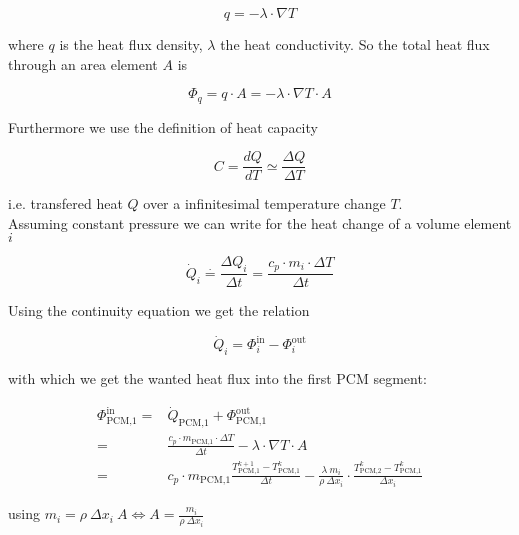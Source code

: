 \documentclass{scrartcl}[12pt, halfparskip]
\begin{document}
\begin{equation}
	q = - \lambda \cdot \nabla T
\end{equation}
\label{eq:def_fouriers_law}

where $q$ is the heat flux density, $\lambda$ the heat conductivity. So the total heat flux through an area element $A$ is

\begin{equation*}
	\Phi_q = q \cdot A =  - \lambda \cdot \nabla T \cdot A
\end{equation*}

Furthermore we use the definition of heat capacity

\begin{equation}
	C = \frac{dQ}{dT} \simeq \frac{\Delta Q}{\Delta T}
\end{equation}
\label{eq:def_heat_capacity}

i.e. transfered heat $Q$ over a infinitesimal temperature change $T$. \\

Assuming constant pressure we can write for the heat change of a volume element $i$

\begin{equation*}
	\dot{Q}_i \stackrel{\cdot}{=} \frac{\Delta Q_i}{\Delta t} = \frac{c_p \cdot m_i \cdot \Delta T}{\Delta t}
\end{equation*}

Using the continuity equation we get the relation

\begin{equation*}
	\dot{Q}_i = \Phi_i^{\text{in}} - \Phi_i^{\text{out}}
\end{equation*}

with which we get the wanted heat flux into the first PCM segment:

\begin{align*}
	\Phi_{\text{PCM,1}}^{\text{in}} = & \dot{Q}_{\text{PCM,1}} + \Phi_{\text{PCM,1}}^{\text{out}} \\
	= & \frac{c_p \cdot m_{\text{PCM,}1} \cdot \Delta T}{\Delta t} - \lambda \cdot \nabla T \cdot A \\
	= & c_p \cdot m_{\text{PCM,}1} \frac{T_{\text{PCM,}1}^{k+1} - T_{\text{PCM,}1}^k}{\Delta t} - \frac{\lambda \ m_i}{\rho \ \Delta x_i} \cdot \frac{T_{\text{PCM,}2}^{k} - T_{\text{PCM,}1}^k}{\Delta x_i}
\end{align*}

using $m_i = \rho \ \Delta x_i \ A \Leftrightarrow A = \frac{m_i}{\rho \ \Delta x_i}$
\end{document}
